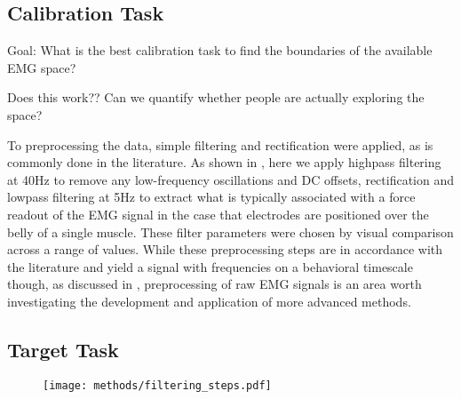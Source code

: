 \documentclass[../main.tex]{subfiles}
\begin{document}





\subsection{Calibration Task}

Goal: What is the best calibration task to find the boundaries of the available EMG space? 

Does this work?? Can we quantify whether people are actually exploring the space?

To preprocessing the data, simple filtering and rectification were applied, as is commonly done in the literature\cite{@sangerBayesianFilteringMyoelectric2007;@churchlandNeuralPopulationDynamics2012a;@churchlandNeuralVariabilityPremotor2006;@sussillo2015}. As shown in , here we apply highpass filtering at 40Hz to remove any low-frequency oscillations and DC offsets, rectification and lowpass filtering at 5Hz to extract what is typically associated with a force readout of the EMG signal in the case that electrodes are positioned over the belly of a single muscle. These filter parameters were chosen by visual comparison across a range of values. While these preprocessing steps are in accordance with the literature and yield a signal with frequencies on a behavioral timescale though, as discussed in , preprocessing of raw EMG signals is an area worth investigating the development and application of more advanced methods.

\subsection{Target Task}

\begin{figure}
  \centering
  \texttt{[image: methods/filtering\_steps.pdf]}
  \caption{}\label{fig:filtering}
\end{figure}
\end{document}
